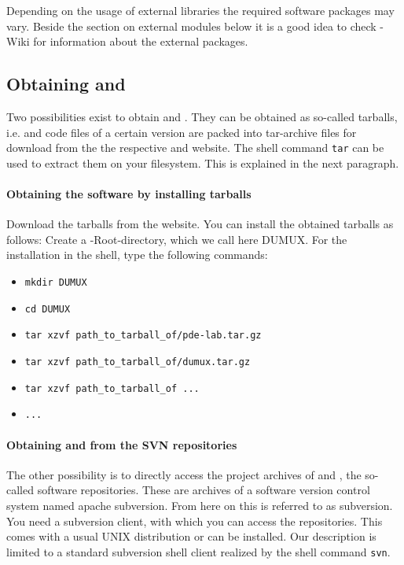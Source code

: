 Depending on the usage of external libraries the required software packages may vary. Beside the section on external modules below it is a good idea to check \Dune-Wiki for information about the external packages.

\subsection{Obtaining \Dune and \Dumux}
Two possibilities exist to obtain \Dune and \Dumux. They can be obtained as so-called tarballs, i.e. \Dumux and \Dune code files of a certain version are packed into tar-archive files for download from the the respective {\Dune} and {\Dumux} website. The shell command \texttt{tar} can be used to extract them on your filesystem. This is explained in the next paragraph. 

\paragraph{Obtaining the software by installing tarballs}
Download the tarballs from the website. You can install the obtained tarballs as follows: Create a \Dune-Root-directory, which we call here DUMUX. For the installation in the shell, type the following commands: 
\begin{itemize}
\item \texttt{mkdir DUMUX}
\item \texttt{cd DUMUX}
\item \texttt{tar xzvf path\_to\_tarball\_of/pde-lab.tar.gz}
\item \texttt{tar xzvf path\_to\_tarball\_of/dumux.tar.gz}
\item \texttt{tar xzvf path\_to\_tarball\_of ...}
\item \texttt{...}
\end{itemize} 

\paragraph{Obtaining \Dune and \Dumux from the SVN repositories} 
The other possibility is to directly access the project archives of \Dune and \Dumux, the so-called software repositories. These are archives of a software version control system named apache subversion. From here on this is referred to as subversion.
You need a subversion client, with which you can access the repositories. This comes with a usual UNIX distribution or can be installed. Our description is limited to a standard subversion shell client realized by the shell command \texttt{svn}.

